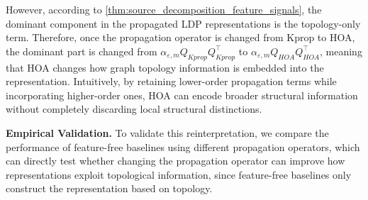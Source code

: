 \documentclass[conference,compsoc]{IEEEtran}
\theoremstyle{boldplain}
\theoremstyle{bolddefinition}
\theoremstyle{remark}
\newcommand{\mypara}[1]{\noindent\textbf{#1.}\xspace}
\newcommand{\kprop}{Kprop\xspace}
\newcommand{\hoa}{HOA\xspace}
\begin{document}
However, according to \autoref{thm:source_decomposition_feature_signals}, the dominant component in the propagated LDP representations is the topology-only term.
Therefore, once the propagation operator is changed from \kprop to \hoa, the dominant part is changed from $\alpha_{\varepsilon,m} Q_{\kprop}Q_{\kprop}^\top$ to $\alpha_{\varepsilon,m} Q_{\hoa}Q_{\hoa}^\top$,
meaning that \hoa changes how graph topology information is embedded into the representation.
Intuitively, by retaining lower-order propagation terms while incorporating higher-order ones, \hoa can encode broader structural information without completely discarding local structural distinctions.

\vspace{0.1cm}

\mypara{Empirical Validation}
To validate this reinterpretation, we compare the performance of feature-free baselines using different propagation operators, which can directly test whether changing the propagation operator can improve how representations exploit topological information, since feature-free baselines only construct the representation based on topology. 








\renewcommand{\gain}[1]{\begingroup\setlength{\fboxsep}{0.7pt}\colorbox{gainbg}{\scriptsize $+$#1}\endgroup}

\renewcommand{\drop}[1]{\begingroup\setlength{\fboxsep}{0.7pt}\colorbox{dropbg}{\scriptsize $-$#1}\endgroup}
\end{document}
